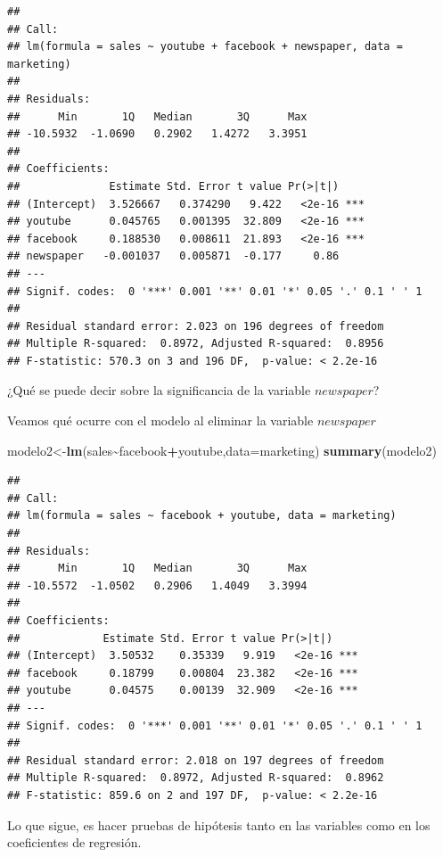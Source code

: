 \documentclass[
]{book}
\newenvironment{Shaded}{\begin{snugshade}}{\end{snugshade}}
\newcommand{\AttributeTok}[1]{\textcolor[rgb]{0.13,0.29,0.53}{#1}}
\newcommand{\FunctionTok}[1]{\textcolor[rgb]{0.13,0.29,0.53}{\textbf{#1}}}
\newcommand{\NormalTok}[1]{#1}
\newcommand{\OtherTok}[1]{\textcolor[rgb]{0.56,0.35,0.01}{#1}}
\newcommand{\SpecialCharTok}[1]{\textcolor[rgb]{0.81,0.36,0.00}{\textbf{#1}}}
\begin{document}
\begin{verbatim}
## 
## Call:
## lm(formula = sales ~ youtube + facebook + newspaper, data = marketing)
## 
## Residuals:
##      Min       1Q   Median       3Q      Max 
## -10.5932  -1.0690   0.2902   1.4272   3.3951 
## 
## Coefficients:
##              Estimate Std. Error t value Pr(>|t|)    
## (Intercept)  3.526667   0.374290   9.422   <2e-16 ***
## youtube      0.045765   0.001395  32.809   <2e-16 ***
## facebook     0.188530   0.008611  21.893   <2e-16 ***
## newspaper   -0.001037   0.005871  -0.177     0.86    
## ---
## Signif. codes:  0 '***' 0.001 '**' 0.01 '*' 0.05 '.' 0.1 ' ' 1
## 
## Residual standard error: 2.023 on 196 degrees of freedom
## Multiple R-squared:  0.8972, Adjusted R-squared:  0.8956 
## F-statistic: 570.3 on 3 and 196 DF,  p-value: < 2.2e-16
\end{verbatim}

¿Qué se puede decir sobre la significancia de la variable \(newspaper\)?

Veamos qué ocurre con el modelo al eliminar la variable \(newspaper\)

\begin{Shaded}
\begin{Highlighting}[]
\NormalTok{modelo2}\OtherTok{\textless{}{-}}\FunctionTok{lm}\NormalTok{(sales}\SpecialCharTok{\textasciitilde{}}\NormalTok{facebook}\SpecialCharTok{+}\NormalTok{youtube,}\AttributeTok{data=}\NormalTok{marketing)}
\FunctionTok{summary}\NormalTok{(modelo2)}
\end{Highlighting}
\end{Shaded}

\begin{verbatim}
## 
## Call:
## lm(formula = sales ~ facebook + youtube, data = marketing)
## 
## Residuals:
##      Min       1Q   Median       3Q      Max 
## -10.5572  -1.0502   0.2906   1.4049   3.3994 
## 
## Coefficients:
##             Estimate Std. Error t value Pr(>|t|)    
## (Intercept)  3.50532    0.35339   9.919   <2e-16 ***
## facebook     0.18799    0.00804  23.382   <2e-16 ***
## youtube      0.04575    0.00139  32.909   <2e-16 ***
## ---
## Signif. codes:  0 '***' 0.001 '**' 0.01 '*' 0.05 '.' 0.1 ' ' 1
## 
## Residual standard error: 2.018 on 197 degrees of freedom
## Multiple R-squared:  0.8972, Adjusted R-squared:  0.8962 
## F-statistic: 859.6 on 2 and 197 DF,  p-value: < 2.2e-16
\end{verbatim}

Lo que sigue, es hacer pruebas de hipótesis tanto en las variables como en los coeficientes de regresión.
\end{document}

